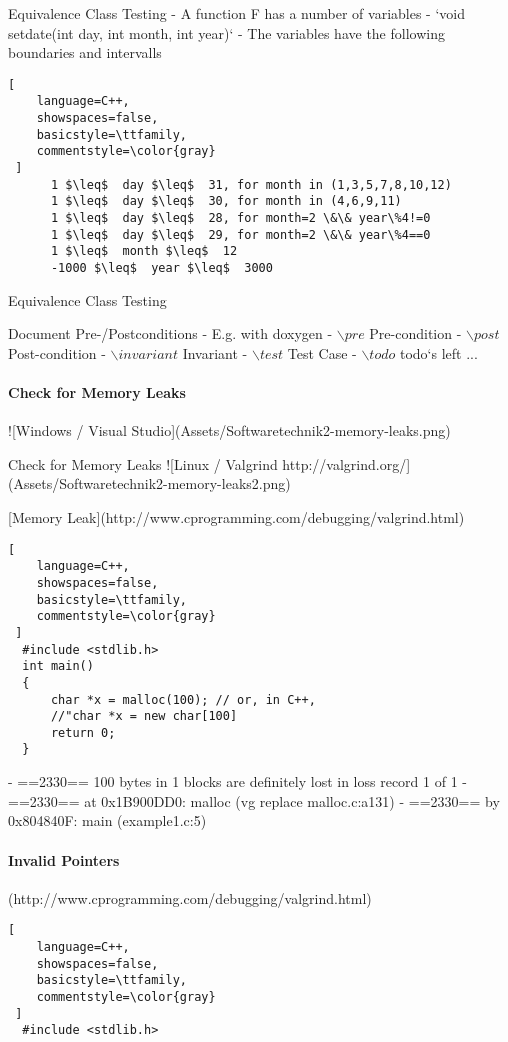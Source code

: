 \documentclass[a4paper]{article}
\begin{document}
\begin{multicols}{3}
  
  Equivalence Class Testing
  - A function F has a number of variables
    - `void setdate(int day, int month, int year)`
  - The variables have the following boundaries and intervalls
      
  \begin{lstlisting}[
    language=C++,
    showspaces=false,
    basicstyle=\ttfamily,
    commentstyle=\color{gray}
 ]
      1 $\leq$  day $\leq$  31, for month in (1,3,5,7,8,10,12)
      1 $\leq$  day $\leq$  30, for month in (4,6,9,11)
      1 $\leq$  day $\leq$  28, for month=2 \&\& year\%4!=0
      1 $\leq$  day $\leq$  29, for month=2 \&\& year\%4==0
      1 $\leq$  month $\leq$  12
      -1000 $\leq$  year $\leq$  3000
      \end{lstlisting}
  
  Equivalence Class Testing
  
  Document Pre-/Postconditions
  - E.g. with doxygen
      - $\backslash pre$ Pre-condition
      - $\backslash post$ Post-condition
      - $\backslash invariant$ Invariant
      - $\backslash test$ Test Case
      - $\backslash todo$ todo‘s left ...
  
  
  \paragraph{Check for Memory Leaks}
  ![Windows / Visual Studio](Assets/Softwaretechnik2-memory-leaks.png)
  
  Check for Memory Leaks
  ![Linux / Valgrind http://valgrind.org/](Assets/Softwaretechnik2-memory-leaks2.png)
  
  [Memory Leak](http://www.cprogramming.com/debugging/valgrind.html)
  
  \begin{lstlisting}[
    language=C++,
    showspaces=false,
    basicstyle=\ttfamily,
    commentstyle=\color{gray}
 ]
  #include <stdlib.h>
  int main()
  {
      char *x = malloc(100); // or, in C++,
      //"char *x = new char[100]
      return 0;
  }
  \end{lstlisting}
  - ==2330== 100 bytes in 1 blocks are definitely lost in loss record 1 of 1
  - ==2330== at 0x1B900DD0: malloc (vg replace malloc.c:a131)
  - ==2330== by 0x804840F: main (example1.c:5)
  
  \paragraph{Invalid Pointers}
  (http://www.cprogramming.com/debugging/valgrind.html)
  \begin{lstlisting}[
    language=C++,
    showspaces=false,
    basicstyle=\ttfamily,
    commentstyle=\color{gray}
 ]
  #include <stdlib.h>
  

\end{lstlisting}
\end{multicols}
\end{document}
